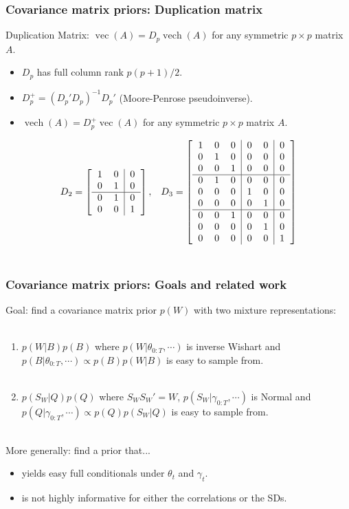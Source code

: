 \documentclass[xcolor=dvipsnames]{beamer}
\DeclareMathOperator{\vech}{vech}
\DeclareMathOperator{\vect}{vec}
\begin{document}
\begin{frame}
\frametitle{Covariance matrix priors: Duplication matrix}
Duplication Matrix: $\vect(A)=D_p\vech(A)$ for any symmetric $p\times p$ matrix $A$.
\begin{itemize}
\item $D_p$ has full column rank $p(p+1)/2$.
\item $D_p^{+}=(D_p'D_p)^{-1}D_p'$ (Moore-Penrose pseudoinverse).
\item $\vech(A)=D_p^+\vect(A)$ for any symmetric $p\times p$ matrix $A$.
\end{itemize}
\pause\begin{align*}
D_2 = \left[\begin{tabular}{cc|c} 1 & 0 & 0 \\ 0 & 1 &  0 \\\hline 0 & 1 & 0\\ 0 & 0 & 1 \end{tabular}\right], && D_3 =  \left[\begin{tabular}{ccc|cc|c}
1 & 0 & 0 & 0 & 0 & 0 \\ 
0 & 1 & 0 & 0 & 0 & 0 \\ 
0 & 0 & 1 & 0 & 0 & 0 \\\hline
0 & 1 & 0 & 0 & 0 & 0 \\
0 & 0 & 0 & 1 & 0 & 0 \\
0 & 0 & 0 & 0 & 1 & 0 \\\hline
0 & 0 & 1 & 0 & 0 & 0 \\
0 & 0 & 0 & 0 & 1 & 0 \\
0 & 0 & 0 & 0 & 0 & 1
\end{tabular}\right]\\~\\
\end{align*}
\end{frame}

\begin{frame}
\frametitle{Covariance matrix priors: Goals and related work}
Goal: find a covariance matrix prior $p(W)$ with two mixture representations:\\~
\begin{enumerate}
\item $p(W|B)p(B)$ where $p(W|\theta_{0:T},\cdots)$ is inverse Wishart and $p(B|\theta_{0:T},\cdots)\propto p(B)p(W|B)$ is easy to sample from.\\~
\item $p(S_W|Q)p(Q)$ where $S_WS_W'=W$, $p(S_W|\gamma_{0:T},\cdots)$ is Normal and $p(Q|\gamma_{0:T},\cdots)\propto p(Q)p(S_W|Q)$ is easy to sample from.\\~
\end{enumerate}
\pause More generally: find a prior that...
\begin{itemize}
\item yields easy full conditionals under $\theta_t$ and $\gamma_t$.
\item is not highly informative for either the correlations or the SDs.\\~
\end{itemize}

\end{frame}
\end{document}
